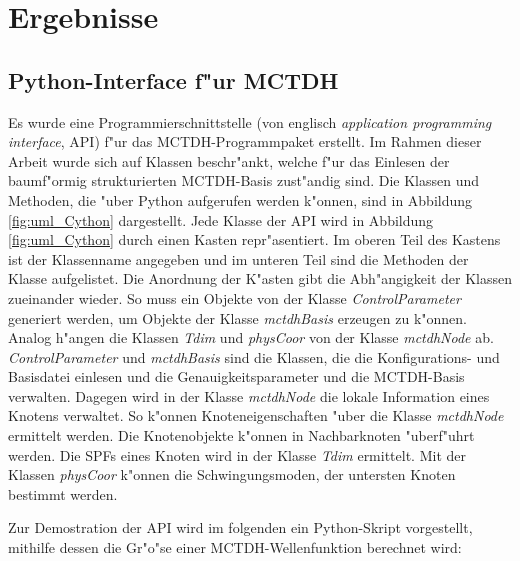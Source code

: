 \chapter{Ergebnisse}

\section{Python-Interface f"ur MCTDH}
\label{sec:PyInterface}


Es wurde eine Programmierschnittstelle (von englisch \textit{application programming interface}, API) f"ur das MCTDH-Programmpaket erstellt.
Im Rahmen dieser Arbeit wurde sich auf Klassen beschr"ankt, welche f"ur das Einlesen der baumf"ormig strukturierten MCTDH-Basis zust"andig sind.
Die Klassen und Methoden, die "uber Python aufgerufen werden k"onnen, sind in Abbildung \ref{fig:uml_Cython} dargestellt. 
Jede Klasse der API wird in Abbildung \ref{fig:uml_Cython} durch einen Kasten repr"asentiert. Im oberen Teil des Kastens ist der Klassenname
angegeben und im unteren Teil sind die Methoden der Klasse aufgelistet. Die Anordnung der K"asten gibt die Abh"angigkeit der Klassen zueinander wieder.
So muss ein Objekte von der Klasse \textit{ControlParameter} generiert werden, um Objekte der Klasse
\textit{mctdhBasis} erzeugen zu k"onnen. Analog h"angen die Klassen \textit{Tdim} und \textit{physCoor} von der Klasse \textit{mctdhNode} ab.
\textit{ControlParameter} und \textit{mctdhBasis} sind die Klassen, die die Konfigurations- und Basisdatei einlesen
und die Genauigkeitsparameter und die MCTDH-Basis verwalten. Dagegen wird in der Klasse \textit{mctdhNode} die lokale Information
eines Knotens verwaltet.
So  k"onnen Knoteneigenschaften "uber die Klasse \textit{mctdhNode} ermittelt werden. 
Die Knotenobjekte k"onnen in Nachbarknoten "uberf"uhrt werden.
Die SPFs eines Knoten wird in der Klasse \textit{Tdim} ermittelt. Mit der Klassen \textit{physCoor} k"onnen
die Schwingungsmoden, der untersten Knoten bestimmt werden. 

Zur Demostration der API wird im folgenden ein Python-Skript vorgestellt, mithilfe dessen die Gr"o"se einer MCTDH-Wellenfunktion berechnet wird:

\newpage

